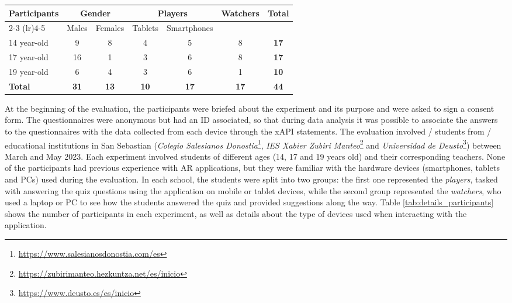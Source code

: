 \begin{table*}[htbp]
\caption{\fontsize{10pt}{11pt}}
  \centering
  \begin{tabular}{l c c c c c c}
    \toprule
    \multirow{2}{*}{Participants} & \multicolumn{2}{c}{Gender} & \multicolumn{2}{c}{Players} & \multirow{2}{*}{Watchers} & \multirow{2}{*}{\textbf{Total}} \\
    \cmidrule(lr){2-3} \cmidrule(lr){4-5}
                            &  \multicolumn{1}{c}{Males} & \multicolumn{1}{c}{Females}  & \multicolumn{1}{c}{Tablets} & \multicolumn{1}{c}{Smartphones} & & \\
    \midrule
    14 year-old & 9 & 8 & 4 & 5 & 8 & \textbf{17} \\
    17 year-old & 16 & 1 & 3 & 6 & 8 & \textbf{17} \\
    19 year-old & 6 & 4 & 3 & 6 & 1 & \textbf{10} \\
    \midrule
    \textbf{Total} & \textbf{31} & \textbf{13} & \textbf{10} & \textbf{17} & \textbf{17} & \textbf{44}\\
    \bottomrule
  \end{tabular}
  \label{tab:details_participants}
\end{table*}

At the beginning of the evaluation, the participants were briefed about the experiment and its purpose and were asked to sign a consent form.
The questionnaires were anonymous but had an ID associated, so that during data analysis it was possible to associate the answers to the questionnaires with the data collected from each device through the xAPI statements.
The evaluation involved \numstudents/ students from \numschools/ educational institutions in San Sebastian (\textit{Colegio Salesianos Donostia}\footnote{\url{https://www.salesianosdonostia.com/es}}, \textit{IES Xabier Zubiri Manteo}\footnote{\url{https://zubirimanteo.hezkuntza.net/es/inicio}} and \textit{Universidad de Deusto}\footnote{\url{https://www.deusto.es/es/inicio}}) between March and May 2023.
Each experiment involved students of different ages (14, 17 and 19 years old) and their corresponding teachers.
None of the participants had previous experience with AR applications, but they were familiar with the hardware devices (smartphones, tablets and PCs) used during the evaluation.
In each school, the students were split into two groups: the first one represented the \textit{players}, tasked with answering the quiz questions using the application on mobile or tablet devices, while the second group represented the \textit{watchers}, who used a laptop or PC to see how the students answered the quiz and provided suggestions along the way.
Table \ref{tab:details_participants} shows the number of participants in each experiment, as well as details about the type of devices used when interacting with the application.

